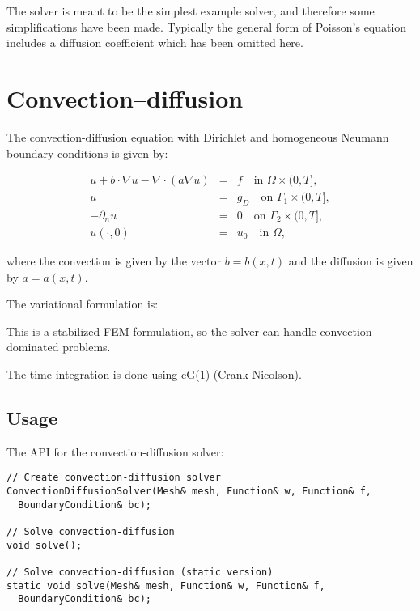 The solver is meant to be the simplest example solver, and therefore
some simplifications have been made. Typically the general form of
Poisson's equation includes a diffusion coefficient which has been
omitted here.

\section{Convection--diffusion}

The convection-diffusion equation with Dirichlet and homogeneous
Neumann boundary conditions is given by:

\begin{equation} \label{eq:convdiff}
  \begin{array}{rcl}
    \dot{u} + b \cdot \nabla u - \nabla \cdot (a \nabla u) &=& f \quad \mbox{in } \Omega \times (0,T], \\
    u &=& g_D \quad \mbox{on } \Gamma_1 \times (0,T], \\
    - \partial_n u &=& 0 \quad \mbox{on } \Gamma_2 \times (0,T], \\
    u(\cdot,0) &=& u_0 \quad \mbox{in } \Omega,
  \end{array}
\end{equation}

where the convection is given by the vector $b = b(x,t)$ and the
diffusion is given by $a = a(x,t)$.

The variational formulation is:


This is a stabilized FEM-formulation, so the solver can handle
convection-dominated problems.

The time integration is done using cG(1) (Crank-Nicolson).

\subsection{Usage}

The API for the convection-diffusion solver:

\begin{verbatim}
// Create convection-diffusion solver
ConvectionDiffusionSolver(Mesh& mesh, Function& w, Function& f,
  BoundaryCondition& bc);
    
// Solve convection-diffusion
void solve();
    
// Solve convection-diffusion (static version)
static void solve(Mesh& mesh, Function& w, Function& f,
  BoundaryCondition& bc);
\end{verbatim}

